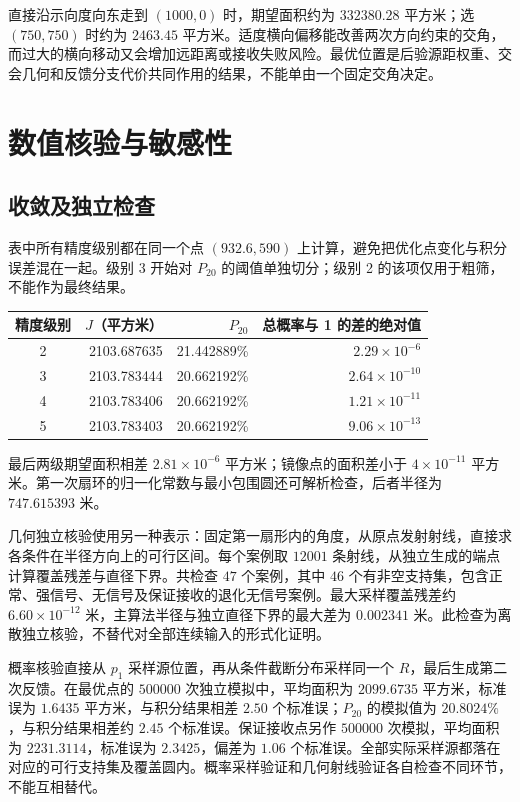 \documentclass[UTF8,a4paper,zihao=5,fontset=none]{ctexart}
\begin{document}
直接沿示向度向东走到 \((1000,0)\) 时，期望面积约为 \(332380.28\) 平方米；选 \((750,750)\) 时约为 \(2463.45\) 平方米。适度横向偏移能改善两次方向约束的交角，而过大的横向移动又会增加远距离或接收失败风险。最优位置是后验源距权重、交会几何和反馈分支代价共同作用的结果，不能单由一个固定交角决定。

\newpage
\section{数值核验与敏感性}
\subsection{收敛及独立检查}
表中所有精度级别都在同一个点 \((932.6,590)\) 上计算，避免把优化点变化与积分误差混在一起。级别 3 开始对 \(P_{20}\) 的阈值单独切分；级别 2 的该项仅用于粗筛，不能作为最终结果。
\begin{table}[H]\centering\small
\begin{tabular}{crrr}\toprule
精度级别 & \(J\)（平方米）& \(P_{20}\) & 总概率与 1 的差的绝对值 \\\midrule
2 & 2103.687635 & 21.442889\% & \(2.29\times10^{-6}\) \\
3 & 2103.783444 & 20.662192\% & \(2.64\times10^{-10}\) \\
4 & 2103.783406 & 20.662192\% & \(1.21\times10^{-11}\) \\
5 & 2103.783403 & 20.662192\% & \(9.06\times10^{-13}\) \\\bottomrule
\end{tabular}
\end{table}
最后两级期望面积相差 \(2.81\times10^{-6}\) 平方米；镜像点的面积差小于 \(4\times10^{-11}\) 平方米。第一次扇环的归一化常数与最小包围圆还可解析检查，后者半径为 \(747.615393\) 米。

几何独立核验使用另一种表示：固定第一扇形内的角度，从原点发射射线，直接求各条件在半径方向上的可行区间。每个案例取 \(12001\) 条射线，从独立生成的端点计算覆盖残差与直径下界。共检查 \(47\) 个案例，其中 \(46\) 个有非空支持集，包含正常、强信号、无信号及保证接收的退化无信号案例。最大采样覆盖残差约 \(6.60\times10^{-12}\) 米，主算法半径与独立直径下界的最大差为 \(0.002341\) 米。此检查为离散独立核验，不替代对全部连续输入的形式化证明。

概率核验直接从 \(p_1\) 采样源位置，再从条件截断分布采样同一个 \(R\)，最后生成第二次反馈。在最优点的 \(500000\) 次独立模拟中，平均面积为 \(2099.6735\) 平方米，标准误为 \(1.6435\) 平方米，与积分结果相差 \(2.50\) 个标准误；\(P_{20}\) 的模拟值为 \(20.8024\%\)，与积分结果相差约 \(2.45\) 个标准误。保证接收点另作 \(500000\) 次模拟，平均面积为 \(2231.3114\)，标准误为 \(2.3425\)，偏差为 \(1.06\) 个标准误。全部实际采样源都落在对应的可行支持集及覆盖圆内。概率采样验证和几何射线验证各自检查不同环节，不能互相替代。
\end{document}
